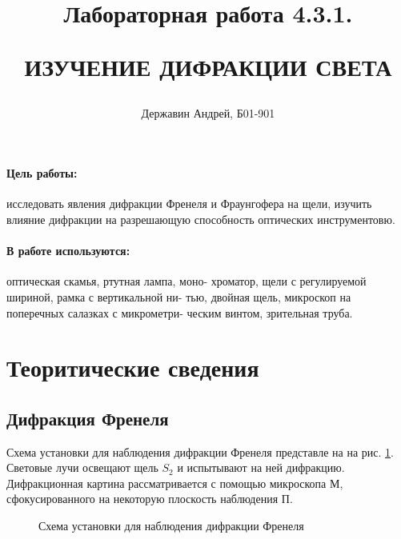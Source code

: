 \documentclass[a5paper,10pt, twoside]{article} %
\title
{
	\hfill \break	\hfill \break
	\hfill \break	\hfill \break
  \hfill \break	\hfill \break
	Лабораторная работа 4.3.1.
	
	ИЗУЧЕНИЕ ДИФРАКЦИИ СВЕТА
}
\author{Державин Андрей, Б01-901}
\begin{document}
	
\maketitle


\thispagestyle{empty} %

\newpage

\tableofcontents %

\newpage


\paragraph{Цель работы:}

	исследовать явления дифракции Френеля и Фраунгофера на щели, изучить влияние дифракции на 
	разрешающую способность оптических инструментовю.

\paragraph{В работе используются:}

	оптическая скамья, ртутная лампа, моно-
	хроматор, щели с регулируемой шириной, рамка с вертикальной ни-
	тью, двойная щель, микроскоп на поперечных салазках с микрометри-
	ческим винтом, зрительная труба.

\section{Теоритические сведения}

\subsection{Дифракция Френеля}
	Схема установки для наблюдения дифракции Френеля представле на на рис. \ref{img:scheme0}.
	Световые лучи освещают щель $S_2$ и испытывают на ней дифракцию. Дифракционная картина
	рассматривается с помощью микроскопа $\text{М}$, сфокусированного на некоторую плоскость
	наблюдения $\text{П}$.

	\begin{figure}[h]\label{img:scheme0}
		\caption{Схема установки для наблюдения дифракции Френеля}
	\end{figure}
\end{document}
